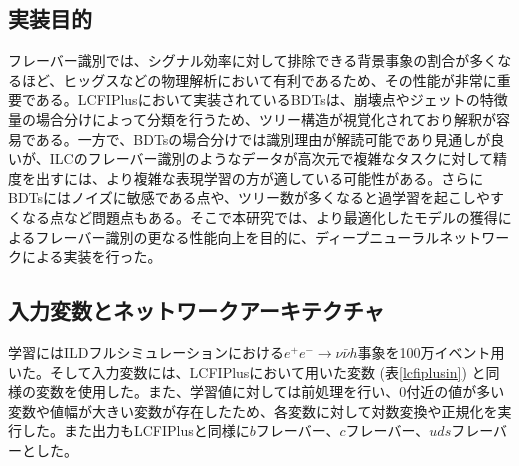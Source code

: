 \subsection{実装目的}
フレーバー識別では、シグナル効率に対して排除できる背景事象の割合が多くなるほど、ヒッグスなどの物理解析において有利であるため、その性能が非常に重要である。LCFIPlusにおいて実装されているBDTsは、崩壊点やジェットの特徴量の場合分けによって分類を行うため、ツリー構造が視覚化されており解釈が容易である。一方で、BDTsの場合分けでは識別理由が解読可能であり見通しが良いが、ILCのフレーバー識別のようなデータが高次元で複雑なタスクに対して精度を出すには、より複雑な表現学習の方が適している可能性がある。さらにBDTsにはノイズに敏感である点や、ツリー数が多くなると過学習を起こしやすくなる点など問題点もある。そこで本研究では、より最適化したモデルの獲得によるフレーバー識別の更なる性能向上を目的に、ディープニューラルネットワークによる実装を行った。
\subsection{入力変数とネットワークアーキテクチャ}
学習にはILDフルシミュレーションにおける$e^+ e^- \rightarrow \nu \bar{\nu} h$事象を100万イベント用いた。そして入力変数には、LCFIPlusにおいて用いた変数 (表\ref{lcfiplusin}) と同様の変数を使用した。また、学習値に対しては前処理を行い、0付近の値が多い変数や値幅が大きい変数が存在したため、各変数に対して対数変換や正規化を実行した。また出力もLCFIPlusと同様に$b$フレーバー、$c$フレーバー、$uds$フレーバーとした。

